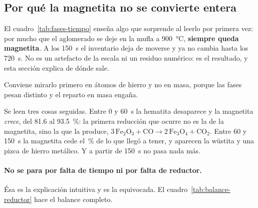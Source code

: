 \subsection{Por qué la magnetita no se convierte entera}
\label{sec:reduccion-incompleta}

El cuadro~\ref{tab:fases-tiempo} enseña algo que sorprende al leerlo por primera
vez: por mucho que el aglomerado se deje en la mufla a \SI{900}{\celsius},
\textbf{siempre queda magnetita}. A los \SI{150}{\second} el inventario deja de
moverse y ya no cambia hasta los \SI{720}{\second}. No es un artefacto de la
escala ni un residuo numérico: es el resultado, y esta sección explica de dónde
sale.

Conviene mirarlo primero en átomos de hierro y no en masa, porque las fases
pesan distinto y el reparto en masa engaña.

\begin{table}[H]
\centering\small

\caption{Reparto del hierro por fases, en \% de los átomos de Fe presentes. El
\SI{6}{\percent} de la ilmenita no se mueve nunca ---su frontera de reducción
exige \datUmbralIlmenita{}\,\% de CO, que no se alcanza--- y a partir de los
\SI{150}{\second} ninguna fila vuelve a cambiar.}
\label{tab:hierro-reparto}
\end{table}

Se leen tres cosas seguidas. Entre \num{0} y \SI{60}{\second} la hematita
desaparece y la magnetita \emph{crece}, del \num{81.6} al
\SI{93.5}{\percent}: la primera reducción que ocurre no es la de la magnetita,
sino la que la produce, $3\,\mathrm{Fe_2O_3} + \mathrm{CO} \rightarrow
2\,\mathrm{Fe_3O_4} + \mathrm{CO_2}$. Entre \num{60} y \SI{150}{\second} la
magnetita cede el \datMagnetitaConvertida\,\% de lo que llegó a tener, y
aparecen la wüstita y una pizca de hierro metálico. Y a partir de
\SI{150}{\second} no pasa nada más.

\paragraph{No se para por falta de tiempo ni por falta de reductor.} Ésa es la
explicación intuitiva y es la equivocada. El cuadro~\ref{tab:balance-reductor}
hace el balance completo.

\begin{table}[H]
\centering\small

\caption{Balance del poder reductor. El carbón genera
\textbf{\datReductorExceso\ veces} más CO$+$H$_2$ del que haría falta para
pasar toda la magnetita a wüstita, y aun así sólo se quita el
\datOxigenoQuitado\,\% del oxígeno. El reductor no es lo que falta.}
\label{tab:balance-reductor}
\end{table}

